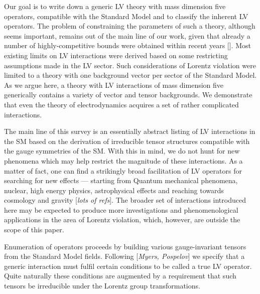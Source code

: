 \documentclass[12pt]{revtex4}
\begin{document}
	Our goal is to write down a generic LV theory with mass dimension
	five operators, compatible with the Standard Model and to classify
	the inherent LV operators. 
	The problem of constraining the parameters of such a theory, although
	seems important, remains out of the main line of our work, given
	that already a number of highly-competitive bounds were obtained
	within recent years [].
	Most existing limits on LV interactions were derived based on some
	restricting assumptions made in the LV sector.
	Such considerations of Lorentz violation were limited to a theory with
	one background vector per sector of the Standard Model.
	As we argue here, a theory with LV interactions of mass
	dimension five generically contains a variety of vector and tensor 
	backgrounds.
	We demonstrate that even the theory of electrodynamics acquires a set
	of rather complicated interactions. 

	The main line of this survey is an essentially abstract listing 
	of LV interactions in the SM based on the derivation of irreducible
	tensor structures compatible with the gauge symmetries of the SM.
	With this in mind, we do not hunt for new phenomena which may help
	restrict the magnitude of these interactions. 
	As a matter of fact, one can find a strikingly broad facilitation of 
	LV operators for searching for new effects ---
	starting from Quantum mechanical phenomena, nuclear, high energy physics,
	astrophysical effects and reaching towards cosmology and gravity
	[{\it lots of refs}].
	The broader set of interactions introduced here may be expected to 
	produce more investigations and phenomenological applications in the area of
	Lorentz violation, which, however, are outside the scope of this paper. 

	Enumeration of operators proceeds by building various gauge-invariant tensors
	from the Standard Model fields. 
	Following [{\it Myers, Pospelov}] we specify that a generic interaction must
	fulfil certain conditions to be called a true LV operator. 
	Quite naturally these conditions are augmented by a requirement that such
	tensors be irreducible under the Lorentz group transformations.
\end{document}
